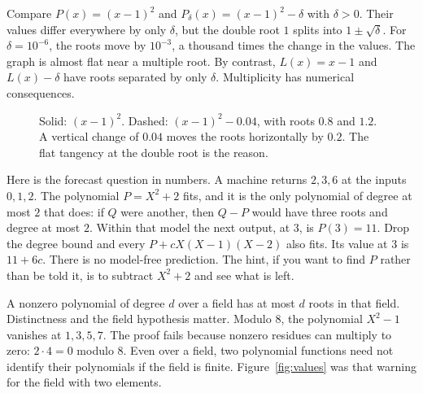 \begin{examplex}
Compare $P(x)=(x-1)^2$ and $P_\delta(x)=(x-1)^2-\delta$ with $\delta>0$. Their values differ everywhere by only $\delta$, but the double root $1$ splits into $1\pm\sqrt\delta$. For $\delta=10^{-6}$, the roots move by $10^{-3}$, a thousand times the change in the values. The graph is almost flat near a multiple root. By contrast, $L(x)=x-1$ and $L(x)-\delta$ have roots separated by only $\delta$. Multiplicity has numerical consequences.
\end{examplex}

\begin{figure}[ht]\centering{}
\caption{Solid: $(x-1)^2$. Dashed: $(x-1)^2-0.04$, with roots $0.8$ and $1.2$. A vertical change of $0.04$ moves the roots horizontally by $0.2$. The flat tangency at the double root is the reason.}
\end{figure}

Here is the forecast question in numbers. A machine returns $2,3,6$ at the inputs $0,1,2$. The polynomial $P=X^2+2$ fits, and it is the only polynomial of degree at most $2$ that does: if $Q$ were another, then $Q-P$ would have three roots and degree at most $2$. Within that model the next output, at $3$, is $P(3)=11$. Drop the degree bound and every $P+cX(X-1)(X-2)$ also fits. Its value at $3$ is $11+6c$. There is no model-free prediction. The hint, if you want to find $P$ rather than be told it, is to subtract $X^2+2$ and see what is left.

\begin{reminder}
A nonzero polynomial of degree $d$ over a field has at most $d$ roots in that field. Distinctness and the field hypothesis matter. Modulo $8$, the polynomial $X^2-1$ vanishes at $1,3,5,7$. The proof fails because nonzero residues can multiply to zero: $2\cdot4=0$ modulo $8$. Even over a field, two polynomial functions need not identify their polynomials if the field is finite. Figure~\ref{fig:values} was that warning for the field with two elements.
\end{reminder}


